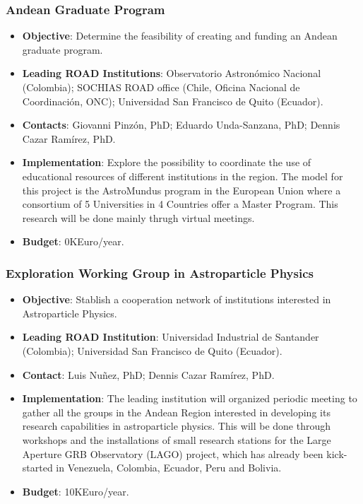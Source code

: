 \documentclass[12pt]{article}
\begin{document}
\subsubsection{Andean Graduate Program}
\begin{itemize}
\item{\bf Objective}: Determine the feasibility of creating and
  funding an Andean graduate program. 
\item{\bf Leading ROAD Institutions}: Observatorio Astron\'omico
  Nacional (Colombia); SOCHIAS ROAD office  (Chile, Oficina
  Nacional de Coordinaci\'on, ONC);  Universidad San
  Francisco de Quito (Ecuador).
\item{\bf Contacts}: Giovanni Pinz\'on, PhD; Eduardo Unda-Sanzana,
  PhD; Dennis Cazar Ram\'irez, PhD. 
\item{\bf Implementation}:
  Explore the possibility to coordinate the use of
  educational resources of different institutions in the region. The
  model for this project is the AstroMundus program in the European
  Union where a consortium of 5 Universities in 4 Countries offer a
  Master Program.  This research will be done mainly thrugh virtual
  meetings.  
\item{\bf Budget}: 0KEuro/year.
\end{itemize}

\subsubsection{Exploration Working Group in Astroparticle Physics}
\begin{itemize}
\item{\bf Objective}: Stablish a cooperation network of institutions
  interested in Astroparticle Physics.
\item{\bf Leading ROAD Institution}: Universidad
  Industrial de Santander (Colombia); Universidad San
  Francisco de Quito (Ecuador). 
\item{\bf Contact}: Luis Nu\~nez, PhD; Dennis Cazar Ram\'irez, PhD. 
\item{\bf Implementation}: The leading institution will organized
  periodic meeting to gather all the groups in the Andean Region
  interested in developing its research capabilities in astroparticle
  physics. This will be done through workshops and the installations
  of small research stations for the Large Aperture GRB Observatory
  (LAGO) project, which has already been kick-started 
  in Venezuela, Colombia, Ecuador, Peru and Bolivia.
\item{\bf Budget}: 10KEuro/year.
\end{itemize}
\end{document}
